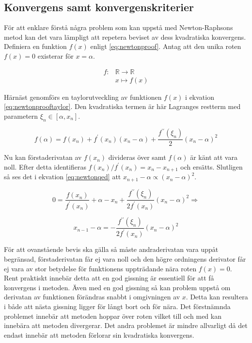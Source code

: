 \subsection{Konvergens samt konvergenskriterier}

För att enklare förstå några problem som kan uppstå med Newton-Raphsons metod kan det vara lämpligt
att repetera beviset av dess kvadratiska konvergens. Definiera en funktion $f(x)$ enligt \eqref{eq:newtonproof}.
Antag att den unika roten $f(x) = 0$ existerar för $x = \alpha$.

\begin{align}
f: & \mathbb{R} \to \mathbb{R} \nonumber \\
   & x \mapsto f(x) \label{eq:newtonproof}
\end{align}

\noindent
Härnäst genomförs en taylorutveckling av funktionen $f(x)$ i ekvation \eqref{eq:newtonprooftaylor}.
Den kvadratiska termen är här Lagranges restterm med parametern $\xi_n \in [\alpha, x_n]$.

\begin{equation}
\label{eq:newtonprooftaylor}
f(\alpha) = f(x_n) + f^\prime(x_n)(x_n-\alpha) + \frac{f^{\prime\prime}(\xi_n)}{2}(x_n-\alpha)^2
\end{equation}

\noindent
Nu kan förstaderivatan av $f(x_n)$ divideras över samt $f(\alpha)$ är känt att vara noll.
Efter detta identifieras $f(x_n)/f^\prime(x_n) = x_n-x_{n+1}$ och ersätts. Slutligen så ses
det i ekvation \eqref{eq:newtonqed} att $x_{n+1}-\alpha \propto (x_{n}-\alpha)^2$.

\begin{equation}
0 = \frac{f(x_n)}{f^\prime(x_n)} + \alpha - x_n + \frac{f^{\prime\prime}(\xi_n)}{2f^\prime(x_n)}(x_n-\alpha)^2
\Rightarrow
\end{equation}

\begin{equation}
\label{eq:newtonqed}
x_{n-1} - \alpha = - \frac{f^{\prime\prime}(\xi_n)}{2f^\prime(x_n)}(x_n-\alpha)^2 
\end{equation}

\noindent
För att ovanstående bevis ska gälla så måste andraderivatan vara uppåt begränsad, förstaderivatan får ej
vara noll och den högre ordningens derivator får ej vara av stor betydelse för funktionens uppträdande
nära roten $f(x) = 0$. Rent praktiskt innebär detta att en god gissning är essentiell för att få
konvergens i metoden. Även med en god gissning så kan problem uppstå om derivatan av funktionen
förändras snabbt i omgivningen av $x$. Detta kan resultera i både att nästa gissning ligger för långt
bort och för nära. Det förstnämnda problemet innebär att metoden hoppar över roten vilket till och med
kan innebära att metoden divergerar. Det andra problemet är mindre allvarligt då det endast innebär 
att metoden förlorar sin kvadratiska konvergens.

